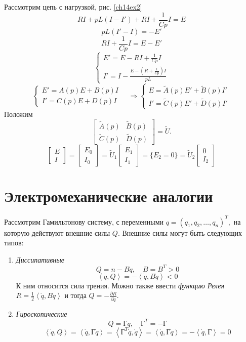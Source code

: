Рассмотрим цепь с нагрузкой, рис. \ref{ch14ex2}
$$RI + pL(I - I') + RI +\frac{1}{Cp}I = E $$
$$pL (I'- I) = - E'$$
$$ RI + \frac{1}{Cp}I  = E -E' $$
$$\begin{cases}
E' = E - RI + \frac{1}{Cp}I  \\
I' = I - \frac{E - (R + \frac{1}{Cp} )I}{pL}
\end{cases}$$
$$ \begin{cases}
E' = A(p)E + B(p)I  \\
I' = C(p) E + D(p) I
\end{cases} \quad \Rightarrow 
 \begin{cases}
E = \tilde A(p)E' +\tilde B(p)I'  \\
I'= \tilde C(p) E' + \tilde D(p) I'
\end{cases}
$$
Положим
$$
\begin{bmatrix}
\tilde A(p)  & \tilde B(p) \\
\tilde C(p) & \tilde D(p)
\end{bmatrix} = \tilde U.
$$
$$
\begin{bmatrix} E \\ I \end{bmatrix} = \begin{bmatrix} E_0 \\ I_0 \end{bmatrix} =  \tilde U_1 \begin{bmatrix} E_1 \\ I_1 \end{bmatrix} = \big \{ E_2 = 0 \big \} = \tilde  U_2 \begin{bmatrix} 0 \\ I_2 \end{bmatrix} 
$$

\section{Электромеханические аналогии}
Рассмотрим Гамильтонову систему, с переменными $q = (q_1, q_2, \ldots , q_n)^T,$ на которую действуют внешние силы $Q.$ Внешние силы могут быть следующих типов:
\begin{enumerate}
\item \textit{Диссипативные}
$$ Q =n- B\dot q, \quad B = B^T >0$$
$$\left< \dot q, Q\right> = - \left< \dot q, B \dot q\right> <0 $$
К ним относится сила трения. Можно также ввести \textit{функцию Релея} $R = \frac{1}{2} \left< \dot q, B \dot q\right>$ и тогда  $Q = - \frac{\partial R}{\partial \dot q}. $

\item \textit{Гироскопические}
$$ Q = \text{Г} \dot q, \quad  \text{Г}^T= -\text{Г} $$
$$ \left< \dot q, Q \right> = \left<\dot q, \text{Г} \dot q  \right> = \left< \text{Г}^T \dot q, \dot q \right> = \left< \dot q, \text{Г} \dot q \right>= - \left< \dot q, \text{Г}  \right> = 0$$
\end{enumerate}

